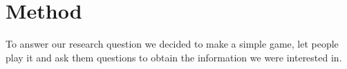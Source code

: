 \section{Method}
\label{Method}

To answer our research question we decided to make a simple game, let people play it and ask them questions to obtain the information we were interested in.



